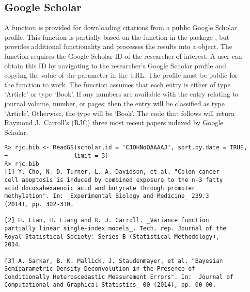 \documentclass[article]{jss}\usepackage[]{graphicx}\usepackage[]{color}
\makeatletter
\newenvironment{kframe}{%
 \def\at@end@of@kframe{}%
 \ifinner\ifhmode%
  \def\at@end@of@kframe{\end{minipage}}%
  \begin{minipage}{\columnwidth}%
 \fi\fi%
 \def\FrameCommand##1{\hskip\@totalleftmargin \hskip-\fboxsep
 \colorbox{shadecolor}{##1}\hskip-\fboxsep
     \hskip-\linewidth \hskip-\@totalleftmargin \hskip\columnwidth}%
 \MakeFramed {\advance\hsize-\width
   \@totalleftmargin\z@ \linewidth\hsize
   \@setminipage}}%
 {\par\unskip\endMakeFramed%
 \at@end@of@kframe}
\newenvironment{knitrout}{}{} %
\makeatother
\begin{document}
\subsection{Google Scholar}
A function is provided for downloading citations from a public Google Scholar profile.  This function is partially based on the function  in the  package \citep{scholar}, but provides additional functionality and processes the results into a  object.  The function requires the Google Scholar ID of the researcher of interest.  A user can obtain this ID by navigating to the researcher's Google Scholar profile and copying the value of the  parameter in the URL.  The profile must be public for the function to work.  The function assumes that each entry is either of type `Article' or type `Book'.  If any numbers are available with the entry relating to journal volume, number, or pages; then the entry will be classified as type `Article'.  Otherwise, the type will be `Book'.  The code that follows will return Raymond J.\ Carroll's (RJC) three most recent papers indexed by Google Scholar.
\begin{knitrout}
\color{fgcolor}\begin{kframe}
\begin{verbatim}
R> rjc.bib <- ReadGS(scholar.id = 'CJOHNoQAAAAJ', sort.by.date = TRUE, 
+                   limit = 3)
R> rjc.bib
[1] Y. Cho, N. D. Turner, L. A. Davidson, et al. "Colon cancer
cell apoptosis is induced by combined exposure to the n-3 fatty
acid docosahexaenoic acid and butyrate through promoter
methylation". In: _Experimental Biology and Medicine_ 239.3
(2014), pp. 302-310.

[2] H. Lian, H. Liang and R. J. Carroll. _Variance function
partially linear single-index models_. Tech. rep. Journal of the
Royal Statistical Society: Series B (Statistical Methodology),
2014.

[3] A. Sarkar, B. K. Mallick, J. Staudenmayer, et al. "Bayesian
Semiparametric Density Deconvolution in the Presence of
Conditionally Heteroscedastic Measurement Errors". In: _Journal of
Computational and Graphical Statistics_ 00 (2014), pp. 00-00.
\end{verbatim}
\end{kframe}
\end{knitrout}
\end{document}
